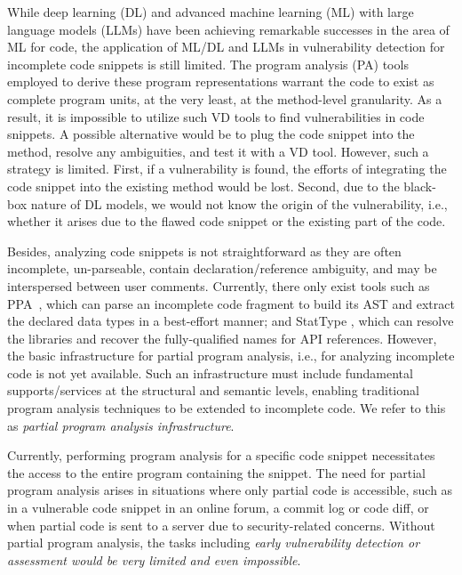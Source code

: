 While deep learning (DL) and advanced machine learning (ML) with large
language models (LLMs) have been achieving remarkable successes in the
area of ML for code, the application of ML/DL and LLMs in
vulnerability detection for incomplete code snippets is still
limited. The program analysis (PA) tools employed to derive these
program representations warrant the code to exist as complete program
units, at the very least, at the method-level granularity. As a
result, it is impossible to utilize such VD tools to find
vulnerabilities in code snippets. A possible alternative would be to
plug the code snippet into the method, resolve any ambiguities, and
test it with a VD tool. However, such a strategy is limited. First, if
a vulnerability is found, the efforts of integrating the code snippet
into the existing method would be lost. Second, due to the black-box
nature of DL models, we would not know the origin of the
vulnerability, i.e., whether it arises due to the flawed code snippet
or the existing part of the code.

Besides, analyzing code snippets is not straightforward as they are often incomplete, un-parseable, contain declaration/reference ambiguity, and may be interspersed between user comments. Currently, there only exist tools such as PPA~\cite{ppa08}, which can parse an incomplete code fragment to build its AST and extract the declared data types in a best-effort manner; and StatType \cite{icse18}, which can resolve the libraries and recover the fully-qualified names for API references. However, the basic infrastructure for partial program analysis, i.e., for analyzing incomplete code is not yet available. Such an infrastructure must include fundamental supports/services at the structural and semantic levels, enabling traditional program analysis techniques to be extended to incomplete code. We refer to this as \textit{partial program analysis infrastructure}.


Currently, performing program analysis for a specific code snippet
necessitates the access to the entire program containing the
snippet. The need for partial program analysis arises in situations
where only partial code is accessible, such as in a vulnerable code
snippet in an online forum, a commit log or code diff, or when partial
code is sent to a server due to security-related concerns. Without
partial program analysis, the tasks including {\em early vulnerability
detection or assessment would be very limited and even impossible}.

